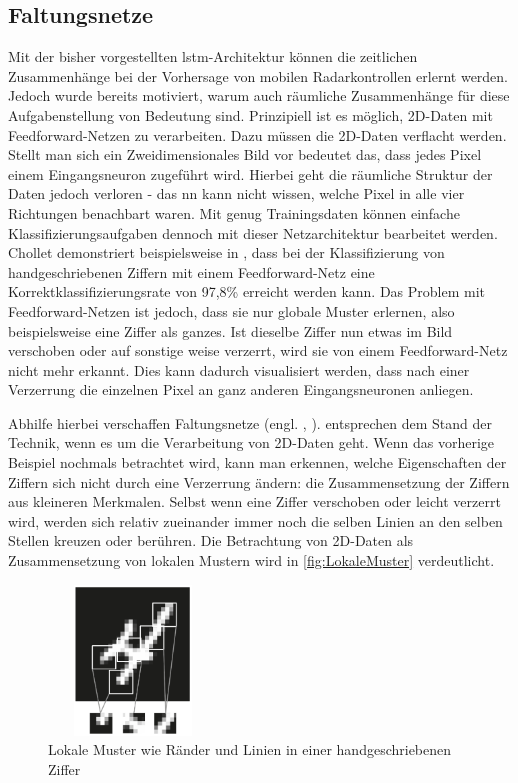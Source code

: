 \subsection{Faltungsnetze}
\label{sec:CNN}

Mit der bisher vorgestellten \acrshort{lstm}-Architektur können die zeitlichen Zusammenhänge bei der Vorhersage von mobilen Radarkontrollen erlernt werden.
Jedoch wurde bereits motiviert, warum auch räumliche Zusammenhänge für diese Aufgabenstellung von Bedeutung sind.
Prinzipiell ist es möglich, 2D-Daten mit Feedforward-Netzen zu verarbeiten.
Dazu müssen die 2D-Daten verflacht werden.
Stellt man sich ein Zweidimensionales Bild vor bedeutet das, dass jedes Pixel einem Eingangsneuron zugeführt wird.
Hierbei geht die räumliche Struktur der Daten jedoch verloren - das \acrshort{nn} kann nicht wissen, welche Pixel in alle vier Richtungen benachbart waren.
Mit genug Trainingsdaten können einfache Klassifizierungsaufgaben dennoch mit dieser Netzarchitektur bearbeitet werden.
Chollet demonstriert beispielsweise in \cite[S. 53]{DeepLearningPythonKeras}, dass bei der Klassifizierung von handgeschriebenen Ziffern mit einem Feedforward-Netz eine Korrektklassifizierungsrate von 97,8\% erreicht werden kann.
Das Problem mit Feedforward-Netzen ist jedoch, dass sie nur globale Muster erlernen, also beispielsweise eine Ziffer als ganzes.
Ist dieselbe Ziffer nun etwas im Bild verschoben oder auf sonstige weise verzerrt, wird sie von einem Feedforward-Netz nicht mehr erkannt.
Dies kann dadurch visualisiert werden, dass nach einer Verzerrung die einzelnen Pixel an ganz anderen Eingangsneuronen anliegen.

Abhilfe hierbei verschaffen Faltungsnetze (engl. , ).
 entsprechen dem Stand der Technik, wenn es um die Verarbeitung von 2D-Daten geht.
Wenn das vorherige Beispiel nochmals betrachtet wird, kann man erkennen, welche Eigenschaften der Ziffern sich nicht durch eine Verzerrung ändern: die Zusammensetzung der Ziffern aus kleineren Merkmalen.
Selbst wenn eine Ziffer verschoben oder leicht verzerrt wird, werden sich relativ zueinander immer noch die selben Linien an den selben Stellen kreuzen oder berühren.
Die Betrachtung von 2D-Daten als Zusammensetzung von lokalen Mustern wird in \autoref{fig:LokaleMuster} verdeutlicht.

\begin{figure}[h]
    \centering
    \includegraphics[width=0.4\textwidth,height=4cm,keepaspectratio=true]{content/images/LokaleMuster.png}
    \caption{Lokale Muster wie Ränder und Linien in einer handgeschriebenen Ziffer \cite[Abb. 5.1]{DeepLearningPythonKeras}}
    \label{fig:LokaleMuster}
\end{figure}

